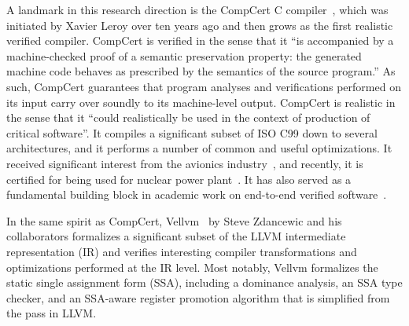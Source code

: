A landmark in this research direction is the CompCert C compiler~\cite{compcert}, which was
initiated by Xavier Leroy over ten years ago and then grows as the first realistic verified
compiler.  CompCert is verified in the sense that it ``is accompanied by a machine-checked proof of
a semantic preservation property: the generated machine code behaves as prescribed by the semantics
of the source program.''  As such, CompCert guarantees that program analyses and verifications
performed on its input carry over soundly to its machine-level output.  CompCert is realistic in the
sense that it ``could realistically be used in the context of production of critical software''.  It
compiles a significant subset of ISO C99 down to several architectures, and it performs a number of
common and useful optimizations.  It received significant interest from the avionics
industry~\cite{TODO}, and recently, it is certified for being used for nuclear power
plant~\cite{compcert-nuclear}.  It has also served as a fundamental building block in academic work
on end-to-end verified software~\cite{TODO}.


In the same spirit as CompCert, Vellvm~\cite{vellvm} by Steve Zdancewic and his collaborators
formalizes a significant subset of the LLVM intermediate representation (IR) and verifies
interesting compiler transformations and optimizations performed at the IR level.  Most notably,
Vellvm formalizes the static single assignment form (SSA), including a dominance analysis, an SSA
type checker, and an SSA-aware register promotion algorithm that is simplified from the
 pass in LLVM.

